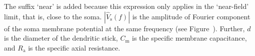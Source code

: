 The suffix `near' is added because this expression only applies in the `near-field' limit, that is,
close to the soma.
$|\hat{V}_\mathrm{s}(f)|$ is the amplitude of Fourier component of the soma membrane potential at the same
frequency (see Figure~). Further, $d$ is the diameter of the dendritic
stick, $C_\mathrm{m}$ is the specific membrane capacitance, and $R_\mathrm{a}$ is the specific axial resistance.  


